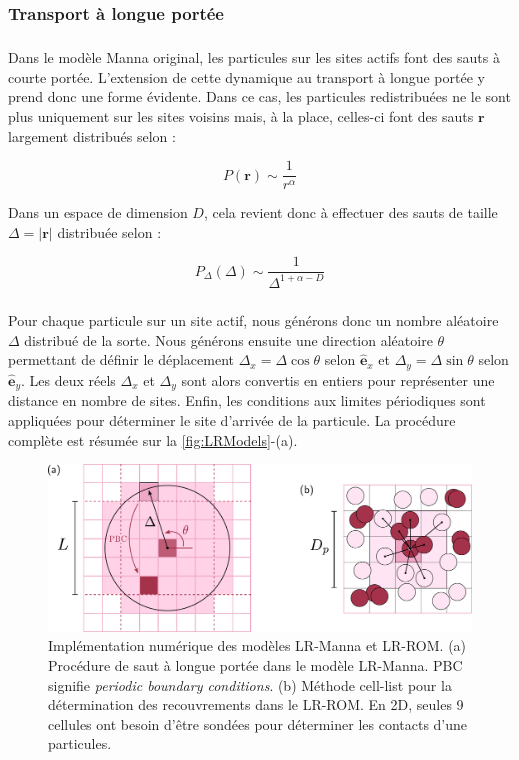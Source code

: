 \subsubsection{Transport à longue portée}

\subparagraph{}Dans le modèle Manna original, les particules sur les sites actifs font des sauts à courte portée. L’extension de cette dynamique au transport à longue portée y prend donc une forme évidente. Dans ce cas, les particules redistribuées ne le sont plus uniquement sur les sites voisins mais, à la place, celles-ci font des sauts $\mathbf{r}$ largement distribués selon :

\begin{equation}
	P(\mathbf{r}) \sim \frac{1}{r^\alpha}
\end{equation}

\noindent Dans un espace de dimension $D$, cela revient donc à effectuer des sauts de taille $\Delta = |\mathbf{r}|$ distribuée selon :

\begin{equation}
	P_\Delta(\Delta) \sim \frac{1}{\Delta^{1+\alpha-D}}
	\label{eq:sauts}
\end{equation}

\subparagraph{}Pour chaque particule sur un site actif, nous générons donc un nombre aléatoire $\Delta$ distribué de la sorte. Nous générons ensuite une direction aléatoire $\theta$ permettant de définir le déplacement $\Delta_x = \Delta \cos \theta$ selon $\hat{\mathbf{e}}_x$ et $\Delta_y = \Delta \sin \theta$ selon $\hat{\mathbf{e}}_y$. Les deux réels $\Delta_x$ et $\Delta_y$ sont alors convertis en entiers pour représenter une distance en nombre de sites. Enfin, les conditions aux limites périodiques sont appliquées pour déterminer le site d'arrivée de la particule. La procédure complète est résumée sur la \autoref{fig:LRModels}-(a).

\begin{figure}[h]
	\centering
	\includegraphics[width=\textwidth]{Chapitre2/Figures/Modeles/MannaJumps.pdf}
	\caption{Implémentation numérique des modèles LR-Manna et LR-ROM. (a) Procédure de saut à longue portée dans le modèle LR-Manna. PBC signifie \textit{periodic boundary conditions}. (b) Méthode cell-list pour la détermination des recouvrements dans le LR-ROM. En 2D, seules 9 cellules ont besoin d'être sondées pour déterminer les contacts d'une particules.}
	\label{fig:LRModels}
\end{figure}

